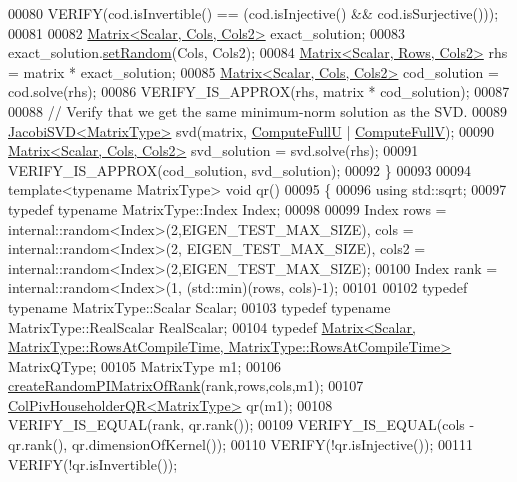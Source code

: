 \begin{DoxyCode}
00080   VERIFY(cod.isInvertible() == (cod.isInjective() && cod.isSurjective()));
00081 
00082   \hyperlink{group___core___module_class_eigen_1_1_matrix}{Matrix<Scalar, Cols, Cols2>} exact\_solution;
00083   exact\_solution.\hyperlink{class_eigen_1_1_plain_object_base_af0e576a0e1aefc9ee346de44cc352ba3}{setRandom}(Cols, Cols2);
00084   \hyperlink{group___core___module_class_eigen_1_1_matrix}{Matrix<Scalar, Rows, Cols2>} rhs = matrix * exact\_solution;
00085   \hyperlink{group___core___module_class_eigen_1_1_matrix}{Matrix<Scalar, Cols, Cols2>} cod\_solution = cod.solve(rhs);
00086   VERIFY\_IS\_APPROX(rhs, matrix * cod\_solution);
00087 
00088   \textcolor{comment}{// Verify that we get the same minimum-norm solution as the SVD.}
00089   \hyperlink{group___s_v_d___module_class_eigen_1_1_jacobi_s_v_d}{JacobiSVD<MatrixType>} svd(matrix, \hyperlink{group__enums_ggae3e239fb70022eb8747994cf5d68b4a9a2b4f91ca5859a4159dbfe8090043817f}{ComputeFullU} | 
      \hyperlink{group__enums_ggae3e239fb70022eb8747994cf5d68b4a9a52c6f7e80bbf9a42297c88f700245b51}{ComputeFullV});
00090   \hyperlink{group___core___module_class_eigen_1_1_matrix}{Matrix<Scalar, Cols, Cols2>} svd\_solution = svd.solve(rhs);
00091   VERIFY\_IS\_APPROX(cod\_solution, svd\_solution);
00092 \}
00093 
00094 \textcolor{keyword}{template}<\textcolor{keyword}{typename} MatrixType> \textcolor{keywordtype}{void} qr()
00095 \{
00096   \textcolor{keyword}{using} std::sqrt;
00097   \textcolor{keyword}{typedef} \textcolor{keyword}{typename} MatrixType::Index Index;
00098 
00099   Index rows = internal::random<Index>(2,EIGEN\_TEST\_MAX\_SIZE), cols = internal::random<Index>(2,
      EIGEN\_TEST\_MAX\_SIZE), cols2 = internal::random<Index>(2,EIGEN\_TEST\_MAX\_SIZE);
00100   Index rank = internal::random<Index>(1, (std::min)(rows, cols)-1);
00101 
00102   \textcolor{keyword}{typedef} \textcolor{keyword}{typename} MatrixType::Scalar Scalar;
00103   \textcolor{keyword}{typedef} \textcolor{keyword}{typename} MatrixType::RealScalar RealScalar;
00104   \textcolor{keyword}{typedef} 
      \hyperlink{group___core___module_class_eigen_1_1_matrix}{Matrix<Scalar, MatrixType::RowsAtCompileTime, MatrixType::RowsAtCompileTime>}
       MatrixQType;
00105   MatrixType m1;
00106   \hyperlink{namespace_eigen_a0d9a7ddcee5c7c8defaba3628455efb2}{createRandomPIMatrixOfRank}(rank,rows,cols,m1);
00107   \hyperlink{group___q_r___module}{ColPivHouseholderQR<MatrixType>} qr(m1);
00108   VERIFY\_IS\_EQUAL(rank, qr.rank());
00109   VERIFY\_IS\_EQUAL(cols - qr.rank(), qr.dimensionOfKernel());
00110   VERIFY(!qr.isInjective());
00111   VERIFY(!qr.isInvertible());

\end{DoxyCode}
